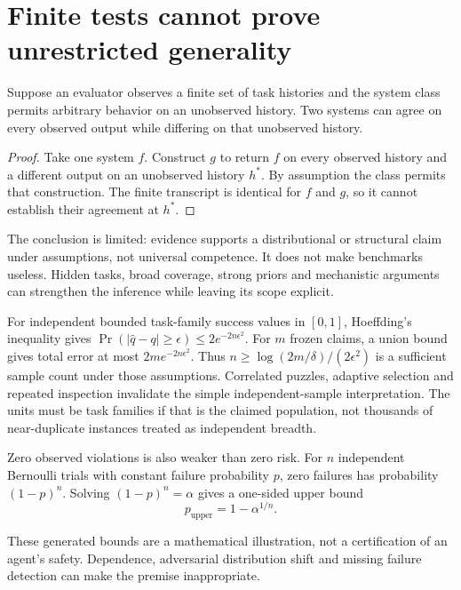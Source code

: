 \section{Finite tests cannot prove unrestricted generality}
\begin{proposition}
Suppose an evaluator observes a finite set of task histories and the system
class permits arbitrary behavior on an unobserved history. Two systems can
agree on every observed output while differing on that unobserved history.
\end{proposition}
\begin{proof}
Take one system $f$. Construct $g$ to return $f$ on every observed history
and a different output on an unobserved history $h^*$. By assumption the class
permits that construction. The finite transcript is identical for $f$ and $g$,
so it cannot establish their agreement at $h^*$.
\end{proof}
The conclusion is limited: evidence supports a distributional or structural
claim under assumptions, not universal competence. It does not make benchmarks
useless. Hidden tasks, broad coverage, strong priors and mechanistic arguments
can strengthen the inference while leaving its scope explicit.

For independent bounded task-family success values in $[0,1]$, Hoeffding's
inequality gives $\Pr(|\hat q-q|\ge\epsilon)\le2e^{-2n\epsilon^2}$.
For $m$ frozen claims, a union bound gives total error at most
$2m e^{-2n\epsilon^2}$. Thus $n\ge\log(2m/\delta)/(2\epsilon^2)$ is a
sufficient sample count under those assumptions. Correlated puzzles, adaptive
selection and repeated inspection invalidate the simple independent-sample
interpretation. The units must be task families if that is the claimed population,
not thousands of near-duplicate instances treated as independent breadth.

Zero observed violations is also weaker than zero risk. For $n$ independent
Bernoulli trials with constant failure probability $p$, zero failures has
probability $(1-p)^n$. Solving $(1-p)^n=\alpha$ gives a one-sided upper bound
\[
p_{\mathrm{upper}}=1-\alpha^{1/n}.
\]
\begin{center}\end{center}
These generated bounds are a mathematical illustration, not a certification
of an agent's safety. Dependence, adversarial distribution shift and missing
failure detection can make the premise inappropriate.

